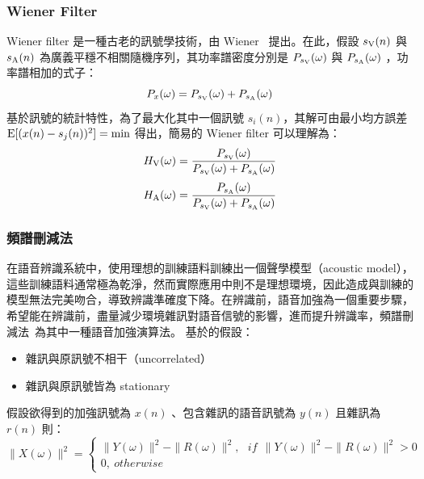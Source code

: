 \subsubsection{Wiener Filter}
Wiener filter 是一種古老的訊號學技術，由 Wiener~\cite{wiener1949extrapolation} 提出。在此，假設 $s_\textup{V}{(n)}$ 與 $s_\textup{A}{(n)}$ 為廣義平穩不相關隨機序列，其功率譜密度分別是 $P_{s_\textup{V}}{(\omega)}$ 與 $P_{s_\textup{A}}{(\omega)}$ ，功率譜相加的式子：
\begin{equation*}
    P_{x}{(\omega)} = P_{s_\textup{V}}{(\omega)} + P_{s_\textup{A}}{(\omega)}
\end{equation*}
基於訊號的統計特性，為了最大化其中一個訊號 $s_i{(n)}$，其解可由最小均方誤差 $ \textup{E}[(x(n)-s_{j}{(n)})^2] = \min$ 得出，簡易的 Wiener filter 可以理解為：
\begin{equation*}
    H_\textup{V}{(\omega)} = \frac{P_{s_\textup{V}}{(\omega)}{}}{P_{s_\textup{V}}{(\omega)} + P_{s_\textup{A}}{(\omega)}}
\end{equation*}
\begin{equation*}
    H_\textup{A}{(\omega)} = \frac{P_{s_\textup{A}}{(\omega)}}{P_{s_\textup{V}}{(\omega)} + P_{s_\textup{A}}{(\omega)}}
\end{equation*}

\subsubsection{頻譜刪減法}
在語音辨識系統中，使用理想的訓練語料訓練出一個聲學模型（acoustic model），這些訓練語料通常極為乾淨，然而實際應用中則不是理想環境，因此造成與訓練的模型無法完美吻合，導致辨識準確度下降。在辨識前，語音加強為一個重要步驟，希望能在辨識前，盡量減少環境雜訊對語音信號的影響，進而提升辨識率，頻譜刪減法~\cite{boll1979suppression}為其中一種語音加強演算法。
基於的假設：
\begin{itemize}
    \item 雜訊與原訊號不相干（uncorrelated）
    \item 雜訊與原訊號皆為 stationary
\end{itemize}
假設欲得到的加強訊號為 $x(n)$ 、包含雜訊的語音訊號為 $y(n)$ 且雜訊為 $r(n)$ 則：
\begin{equation*}
	\|X(\omega)\|^2=\left\{\begin{matrix}\|Y(\omega)\|^2-\|R(\omega)\|^2,\ \ \ if\ \ \|Y(\omega)\|^2-\|R(\omega)\|^2 > 0
\\ 
0,\ otherwise
\end{matrix}\right.
\end{equation*}


